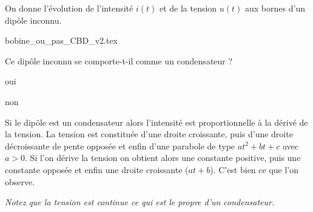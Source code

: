 On donne l'évolution de l'intensité $i(t)$ et de la tension $u(t)$ aux bornes d'un dipôle inconnu.

\begin{center}
{bobine_ou_pas_CBD_v2.tex}
\end{center}

\debutEntrainement


\begin{enonce}
Ce dipôle inconnu se comporte-t-il comme un condensateur ?
\begin{listeQCM2Colonnes}
\item oui
\item non
\end{listeQCM2Colonnes}
\end{enonce}

\reponse{\reponseA{}}   
 
\begin{corrige}
Si le dipôle est un condensateur alors l'intensité est proportionnelle à la dérivé de la tension. La tension est constituée d'une droite croissante, puis d'une droite décroissante de pente opposée et enfin d'une parabole de type $at^2+bt+c$ avec $a>0$. Si l'on dérive la tension on obtient alors une constante positive, puis une constante opposée et enfin une droite croissante ($at+b$). C'est bien ce que l'on observe.

{\itshape Notez que la tension est continue ce qui est le propre d'un condensateur.}
\end{corrige}


\finEntrainement







